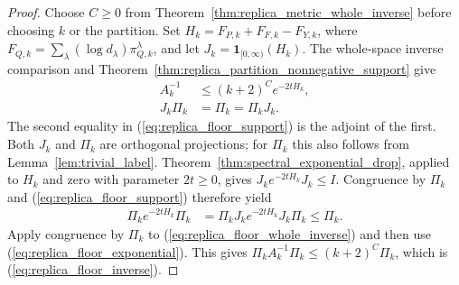 \begin{proof}\leanok
    Choose $C\ge0$ from Theorem~\ref{thm:replica_metric_whole_inverse} before
    choosing $k$ or the partition. Set
    $H_k=F_{P,k}+F_{F,k}-F_{Y,k}$, where
    $F_{Q,k}=\sum_\lambda(\log d_\lambda)\pi^\lambda_{Q,k}$, and let
    $J_k=\mathbf 1_{[0,\infty)}(H_k)$. The whole-space inverse comparison
    and Theorem~\ref{thm:replica_partition_nonnegative_support} give
    \begin{align}
        A_k^{-1} & \le(k+2)^C e^{-2tH_k},
        \label{eq:replica_floor_whole_inverse} \\
        J_k\Pi_k & =\Pi_k=\Pi_kJ_k.
        \label{eq:replica_floor_support}
    \end{align}
    The second equality in (\ref{eq:replica_floor_support}) is the adjoint
    of the first. Both $J_k$ and $\Pi_k$ are orthogonal projections; for
    $\Pi_k$ this also follows from Lemma~\ref{lem:trivial_label}.
    Theorem~\ref{thm:spectral_exponential_drop}, applied to $H_k$ and zero
    with parameter $2t\ge0$, gives $J_ke^{-2tH_k}J_k\le I$. Congruence by
    $\Pi_k$ and (\ref{eq:replica_floor_support}) therefore yield
    \begin{align}
        \Pi_ke^{-2tH_k}\Pi_k
         & =\Pi_kJ_ke^{-2tH_k}J_k\Pi_k\le\Pi_k.
        \label{eq:replica_floor_exponential}
    \end{align}
    Apply congruence by $\Pi_k$ to
    (\ref{eq:replica_floor_whole_inverse}) and then use
    (\ref{eq:replica_floor_exponential}). This gives
    $\Pi_kA_k^{-1}\Pi_k\le(k+2)^C\Pi_k$, which is
    (\ref{eq:replica_floor_inverse}).


\end{proof}
